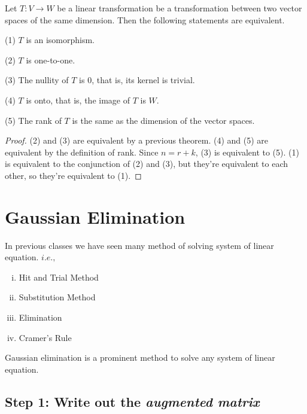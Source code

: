 \begin{theorem}
Let $T:V\to W$ be a linear transformation be a transformation between two vector spaces of the same dimension.  Then the following statements are equivalent.

(1) $T$ is an isomorphism.

(2) $T$ is one-to-one.

(3) The nullity of $T$ is 0, that is, its kernel is trivial.

(4) $T$ is onto, that is, the image of $T$ is $W$.

(5) The rank of $T$ is the same as the dimension of the vector spaces.
\end{theorem}

\begin{proof}
(2) and (3) are equivalent by a previous theorem.  (4) and (5) are equivalent by the definition of rank.  Since $n=r+k$, (3) is equivalent to (5).  (1) is equivalent to the conjunction of (2) and (3), but they're equivalent to each other, so they're equivalent to (1).
\end{proof}

\section{Gaussian Elimination}
In previous classes we have seen many method of solving system of linear equation. $i.e.,$
\begin{enumerate}[i.]
    \item Hit and Trial Method
    \item Substitution Method
    \item Elimination 
    \item Cramer's Rule
\end{enumerate}
Gaussian elimination is a prominent method to solve any system of linear equation. 

\subsection*{Step 1: Write out the \emph{augmented matrix}}

